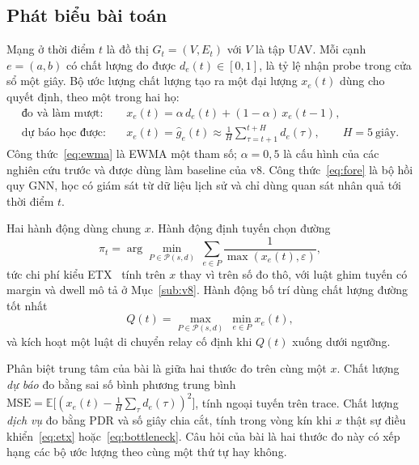 \subsection{Phát biểu bài toán}
Mạng ở thời điểm $t$ là đồ thị $G_t=(V,E_t)$ với $V$ là tập UAV. Mỗi cạnh
$e=(a,b)$ có chất lượng đo được $d_e(t)\in[0,1]$, là tỷ lệ nhận probe trong
cửa sổ một giây. Bộ ước lượng chất lượng tạo ra một đại lượng $x_e(t)$ dùng cho
quyết định, theo một trong hai họ:
\begin{align}
\text{đo và làm mượt:}\quad & x_e(t)=\alpha\, d_e(t)+(1-\alpha)\,x_e(t-1),\label{eq:ewma}\\
\text{dự báo học được:}\quad & x_e(t)=\hat g_e(t)\approx
\frac{1}{H}\sum_{\tau=t+1}^{t+H} d_e(\tau),\qquad H=5\ \text{giây}.\label{eq:fore}
\end{align}
Công thức~\eqref{eq:ewma} là EWMA một tham số; $\alpha=0{,}5$ là cấu hình của
các nghiên cứu trước và được dùng làm baseline của v8. Công thức~\eqref{eq:fore}
là bộ hồi quy GNN, học có giám sát từ dữ liệu lịch sử và chỉ dùng quan sát
nhân quả tới thời điểm $t$.

Hai hành động dùng chung $x$. Hành động định tuyến chọn đường
\begin{equation}
\pi_t=\arg\min_{P\in\mathcal{P}(s,d)}\ \sum_{e\in P}\frac{1}{\max(x_e(t),\varepsilon)},
\label{eq:etx}
\end{equation}
tức chi phí kiểu ETX~\cite{decouto} tính trên $x$ thay vì trên số đo thô, với
luật ghim tuyến có margin và dwell mô tả ở Mục~\ref{sub:v8}. Hành động bố trí
dùng chất lượng đường tốt nhất
\begin{equation}
Q(t)=\max_{P\in\mathcal{P}(s,d)}\ \min_{e\in P} x_e(t),
\label{eq:bottleneck}
\end{equation}
và kích hoạt một luật di chuyển relay cố định khi $Q(t)$ xuống dưới ngưỡng.

Phân biệt trung tâm của bài là giữa hai thước đo trên cùng một $x$. Chất lượng
\emph{dự báo} đo bằng sai số bình phương trung bình
$\mathrm{MSE}=\mathbb{E}\big[(x_e(t)-\frac{1}{H}\sum_\tau d_e(\tau))^2\big]$,
tính ngoại tuyến trên trace. Chất lượng \emph{dịch vụ} đo bằng PDR và số giây
chia cắt, tính trong vòng kín khi $x$ thật sự điều khiển~\eqref{eq:etx}
hoặc~\eqref{eq:bottleneck}. Câu hỏi của bài là hai thước đo này có xếp hạng các
bộ ước lượng theo cùng một thứ tự hay không.

